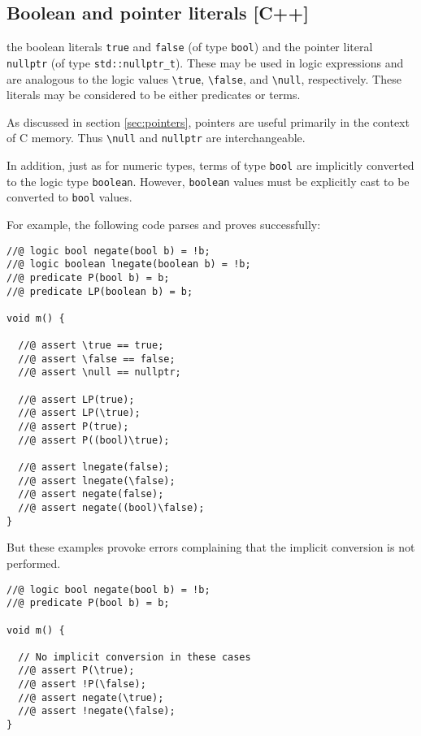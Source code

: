 \subsection{Boolean and pointer literals [C++]}

\lang the boolean literals
\lstinline|true| and \lstinline|false| (of type \lstinline|bool|) and the pointer literal \lstinline|nullptr| (of type \lstinline|std::nullptr_t|). 
These may be used in logic expressions and are analogous to the logic values \lstinline|\true|, 
\lstinline|\false|, and \lstinline|\null|, respectively. 
These literals may be considered
to be either predicates or terms.

As discussed in section \ref{sec:pointers}, pointers are useful primarily in
the context of C memory. Thus \lstinline|\null| and \lstinline|nullptr|
are interchangeable.

In addition, just as for numeric types, terms of type \lstinline|bool| are
implicitly converted to the logic type \lstinline|boolean|.
However, \lstinline|boolean| values must be explicitly cast to be
converted to \lstinline|bool| values.

For example, the following code parses and proves successfully:
\begin{lstlisting}
//@ logic bool negate(bool b) = !b;
//@ logic boolean lnegate(boolean b) = !b;
//@ predicate P(bool b) = b;
//@ predicate LP(boolean b) = b;

void m() {

  //@ assert \true == true;
  //@ assert \false == false;
  //@ assert \null == nullptr;

  //@ assert LP(true);
  //@ assert LP(\true);
  //@ assert P(true);
  //@ assert P((bool)\true);

  //@ assert lnegate(false);
  //@ assert lnegate(\false);
  //@ assert negate(false);
  //@ assert negate((bool)\false);
}
\end{lstlisting}

But these examples provoke errors complaining that the implicit conversion
is not performed.
\begin{lstlisting}
//@ logic bool negate(bool b) = !b;
//@ predicate P(bool b) = b;

void m() {

  // No implicit conversion in these cases
  //@ assert P(\true);
  //@ assert !P(\false);
  //@ assert negate(\true);
  //@ assert !negate(\false);
}
\end{lstlisting}

